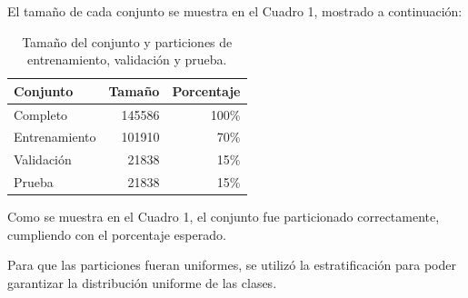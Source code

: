 \documentclass[12pt,a4paper]{article}
\begin{document}
El tamaño de cada conjunto se muestra en el Cuadro 1, mostrado a continuación:

\begin{table}[ht]
  \centering
  \begin{tabular}{lrr}
    \hline
    Conjunto        & Tamaño & Porcentaje \\
    \hline
    Completo        & 145586 & 100\% \\
    Entrenamiento   & 101910 & 70\% \\
    Validación      & 21838  & 15\% \\
    Prueba          & 21838  & 15\% \\
    \hline
  \end{tabular}
  \caption{Tamaño del conjunto y particiones de entrenamiento, validación y prueba.}
  \label{tab:particiones_kdd99}
\end{table}

Como se muestra en el Cuadro 1, el conjunto fue particionado correctamente, cumpliendo con el porcentaje esperado.

Para que las particiones fueran uniformes, se utilizó la estratificación para poder garantizar la distribución uniforme de las clases.
\end{document}
